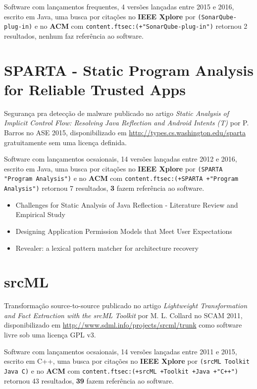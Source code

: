 Software com lançamentos frequentes,
4 versões lançadas
entre 2015 e 2016,
escrito em Java,
uma busca por citações no {\bf IEEE Xplore} por
\texttt{(SonarQube-plug-in)}
e no {\bf ACM} com
\texttt{content.ftsec:(+"SonarQube-plug-in")}
retornou
2 resultados,
nenhum faz referência ao software.


\section{SPARTA - Static Program Analysis for Reliable Trusted Apps}

Segurança pra detecção de malware
publicado no artigo {\it Static Analysis of Implicit Control Flow: Resolving Java Reflection and Android Intents (T)}
por P. Barros
no ASE 2015,
disponibilizado em \url{http://types.cs.washington.edu/sparta}
gratuitamente
sem uma licença definida.

Software com lançamentos ocsaionais,
14 versões lançadas
entre 2012 e 2016,
escrito em Java,
uma busca por citações no {\bf IEEE Xplore} por
\texttt{(SPARTA "Program Analysis")}
e no {\bf ACM} com
\texttt{content.ftsec:(+SPARTA +"Program Analysis")}
retornou
7 resultados,
{\bf 3} fazem referência ao software.

\begin{itemize}
\item Challenges for Static Analysis of Java Reflection - Literature Review and Empirical Study
\item Designing Application Permission Models that Meet User Expectations
\item Revealer: a lexical pattern matcher for architecture recovery
\end{itemize}

\section{srcML}

Transformação source-to-source
publicado no artigo {\it Lightweight Transformation and Fact Extraction with the srcML Toolkit}
por M. L. Collard
no SCAM 2011,
disponibilizado em \url{http://www.sdml.info/projects/srcml/trunk}
como software livre
sob uma licença GPL v3.

Software com lançamentos ocsaionais,
14 versões lançadas
entre 2011 e 2015,
escrito em C++,
uma busca por citações no {\bf IEEE Xplore} por
\texttt{(srcML Toolkit Java C)}
e no {\bf ACM} com
\texttt{content.ftsec:(+srcML +Toolkit +Java +"C++")}
retornou
43 resultados,
{\bf 39} fazem referência ao software.

